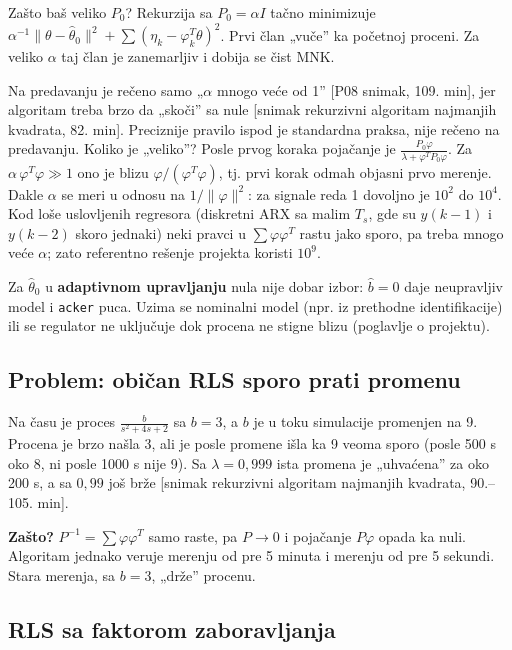 \documentclass[11pt,a4paper,parskip=half,headsepline,numbers=noenddot]{scrartcl}
\DeclareRobustCommand{\izvor}[1]{{\small\color{izvorC}[#1]}}
\begin{document}
\begin{zasto}
Zašto baš veliko \(P_0\)? Rekurzija sa \(P_0 = \alpha I\) tačno minimizuje \(\alpha^{-1}\|\theta - \hat\theta_0\|^2 + \sum(\eta_k - \varphi_k^T\theta)^2\). Prvi član „vuče'' ka početnoj proceni. Za veliko \(\alpha\) taj član je zanemarljiv i dobija se čist MNK.
\end{zasto}

Na predavanju je rečeno samo „\(\alpha\) mnogo veće od 1'' \izvor{P08 snimak, 109. min}, jer algoritam treba brzo da „skoči'' sa nule \izvor{snimak rekurzivni algoritam najmanjih kvadrata, 82. min}. Preciznije pravilo ispod je standardna praksa, nije rečeno na predavanju. Koliko je „veliko''? Posle prvog koraka pojačanje je \(\frac{P_0\varphi}{\lambda + \varphi^TP_0\varphi}\). Za \(\alpha\,\varphi^T\varphi \gg 1\) ono je blizu \(\varphi/(\varphi^T\varphi)\), tj. prvi korak odmah objasni prvo merenje. Dakle \(\alpha\) se meri u odnosu na \(1/\|\varphi\|^2\): za signale reda 1 dovoljno je \(10^2\) do \(10^4\). Kod loše uslovljenih regresora (diskretni ARX sa malim \(T_s\), gde su \(y(k-1)\) i \(y(k-2)\) skoro jednaki) neki pravci u \(\sum\varphi\varphi^T\) rastu jako sporo, pa treba mnogo veće \(\alpha\); zato referentno rešenje projekta koristi \(10^9\).

Za \(\hat\theta_0\) u \textbf{adaptivnom upravljanju} nula nije dobar izbor: \(\hat b = 0\) daje neupravljiv model i \texttt{acker} puca. Uzima se nominalni model (npr. iz prethodne identifikacije) ili se regulator ne uključuje dok procena ne stigne blizu (poglavlje o projektu).

\subsection{Problem: običan RLS sporo prati promenu}

Na času je proces \(\frac{b}{s^2 + 4s + 2}\) sa \(b = 3\), a \(b\) je u toku simulacije promenjen na 9. Procena je brzo našla 3, ali je posle promene išla ka 9 veoma sporo (posle 500 s oko 8, ni posle 1000 s nije 9). Sa \(\lambda = 0{,}999\) ista promena je „uhvaćena'' za oko 200 s, a sa \(0{,}99\) još brže \izvor{snimak rekurzivni algoritam najmanjih kvadrata, 90.--105. min}.

\textbf{Zašto?} \(P^{-1} = \sum\varphi\varphi^T\) samo raste, pa \(P \to 0\) i pojačanje \(P\varphi\) opada ka nuli. Algoritam jednako veruje merenju od pre 5 minuta i merenju od pre 5 sekundi. Stara merenja, sa \(b = 3\), „drže'' procenu.

\subsection{RLS sa faktorom zaboravljanja}
\end{document}
